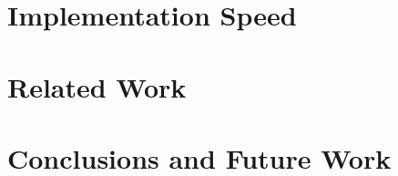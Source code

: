 \documentclass[preprint]{sigplanconf}
\begin{document}
\section{Implementation Speed}

\section{Related Work}

\section{Conclusions and Future Work}




\begin{comment}

There have been several attempts at generic traversal/query methods in Haskell. One initial paper was <a href="http://doi.acm.org/10.1145/604174.604179">"Scrap your boilerplate: a practical design pattern for generic programming"</a> (<a href="http://www.cs.vu.nl/boilerplate/tldi03.pdf">free copy</a>) - which I will refer to as SYB. Another mechanism is <a href="http://doi.acm.org/10.1145/1159803.1159834">"A Pattern for Almost Compositional Functions"</a> (<a href="http://www.cs.chalmers.se/%

The principle advantage of the Play class over these two papers is that it requires no type system extensions, compared to rank-2 types for SYB and GADT's for Compos. The simplicity of the types required means that the user is free to concentrate on the operations within the class, without requiring thought as to the type trickery required. The Play pattern has been implemented in Yhc for the Core data type, and in Catch on several data types within the program.
</p>
<p>
    This document proceeds as follows:
</p>
<ol>
    <li>The motivation and use cases for Play</li>
    <li>How to use the Play class</li>
    <li>Derivation of a Play instance for your own data type</li>
    <li>Extension to PlayEx</li>
    <li>A comparison to the SYB paper</li>
    <li>A comparison to the Compos paper</li>
</ol>
<p>
    All the examples used in this document can be found in the darcs repository, under the <tt>Examples</tt> directory.
</p>
<pre>
darcs get --partial <a href="http://www.cs.york.ac.uk/fp/darcs/play">http://www.cs.york.ac.uk/fp/darcs/play</a>
</pre>
<p>
    If you only wish to read a small fraction of this document, can I suggest you pay particular attention to <tt>mapUnder</tt> and <tt>allOver</tt> - these are by far the most common transformational patterns.
</p>


\end{comment}
\end{document}
